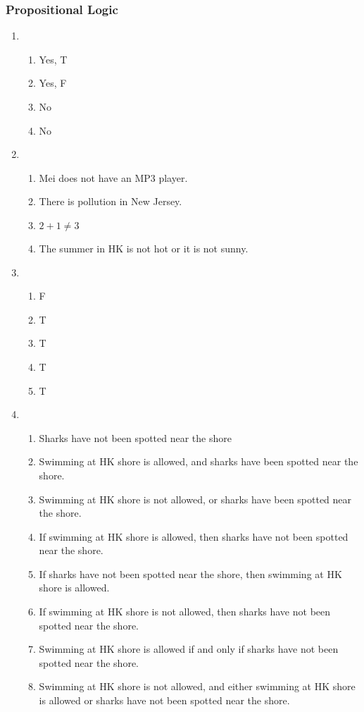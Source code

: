 \documentclass{sig-alternate-05-2015}
\begin{document}
\subsubsection{Propositional Logic}
\begin{enumerate}
\item 
\begin{enumerate}
	\item Yes, T
	\item Yes, F
	\item No
	\item No
\end{enumerate}

\item 
\begin{enumerate}
	\item Mei does not have an MP3 player.
	\item There is pollution
	in New Jersey.
	\item $2 + 1 \ne 3$
	\item The summer in HK is not
	hot or it is not sunny.
\end{enumerate}

\item 
\begin{enumerate}
	\item F
	\item T
	\item T
	\item T
	\item T
\end{enumerate}

\item 
\begin{enumerate}
	\item Sharks have
	not been spotted near the shore
	\item Swimming at HK shore is allowed, and sharks have been spotted near the
	shore.
	\item Swimming at HK shore is not allowed,
	or sharks have been spotted near the shore.
	\item If swimming
	at HK shore is allowed, then sharks have not been
	spotted near the shore.
	\item If sharks have not been spotted near
	the shore, then swimming at HK shore is allowed.
	\item If swimming at HK shore is not allowed, then
	sharks have not been spotted near the shore.
	\item Swimming at HK shore is allowed if and only if sharks have
	not been spotted near the shore.
	\item Swimming at HK shore is not allowed, and either swimming at HK shore is allowed or sharks have not been spotted near
	the shore.
\end{enumerate}


\end{enumerate}
\end{document}
